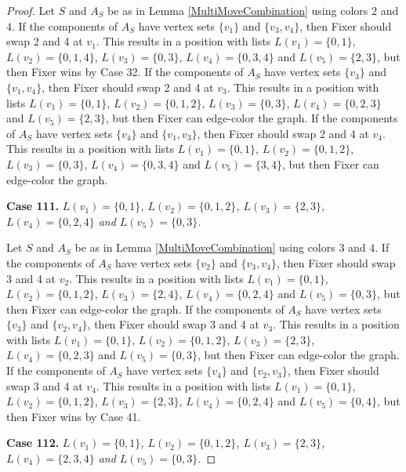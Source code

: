 \documentclass[12pt]{amsart}
\theoremstyle{plain}
\theoremstyle{definition}
\theoremstyle{remark}
\begin{document}
\begin{proof}
Let $S$ and $A_S$ be as in Lemma \ref{MultiMoveCombination} using colors $2$ and $4$. If the components of $A_S$ have vertex sets $\{v_1\}$ and $\{v_3, v_4\}$, then Fixer should swap 2 and 4 at $v_1$. This results in a position with lists $L(v_1) = \{0, 1\}$, $L(v_2) = \{0, 1, 4\}$, $L(v_3) = \{0, 3\}$, $L(v_4) = \{0, 3, 4\}$ and $L(v_5) = \{2, 3\}$, but then Fixer wins by Case 32.
If the components of $A_S$ have vertex sets $\{v_3\}$ and $\{v_1, v_4\}$, then Fixer should swap 2 and 4 at $v_3$. This results in a position with lists $L(v_1) = \{0, 1\}$, $L(v_2) = \{0, 1, 2\}$, $L(v_3) = \{0, 3\}$, $L(v_4) = \{0, 2, 3\}$ and $L(v_5) = \{2, 3\}$, but then Fixer can edge-color the graph.
If the components of $A_S$ have vertex sets $\{v_4\}$ and $\{v_1, v_3\}$, then Fixer should swap 2 and 4 at $v_4$. This results in a position with lists $L(v_1) = \{0, 1\}$, $L(v_2) = \{0, 1, 2\}$, $L(v_3) = \{0, 3\}$, $L(v_4) = \{0, 3, 4\}$ and $L(v_5) = \{3, 4\}$, but then Fixer can edge-color the graph.

\noindent\textbf{Case 111.  }\textit{$L(v_1) = \{0, 1\}$, $L(v_2) = \{0, 1, 2\}$, $L(v_3) = \{2, 3\}$, $L(v_4) = \{0, 2, 4\}$ and $L(v_5) = \{0, 3\}$.}

Let $S$ and $A_S$ be as in Lemma \ref{MultiMoveCombination} using colors $3$ and $4$. If the components of $A_S$ have vertex sets $\{v_2\}$ and $\{v_3, v_4\}$, then Fixer should swap 3 and 4 at $v_2$. This results in a position with lists $L(v_1) = \{0, 1\}$, $L(v_2) = \{0, 1, 2\}$, $L(v_3) = \{2, 4\}$, $L(v_4) = \{0, 2, 4\}$ and $L(v_5) = \{0, 3\}$, but then Fixer can edge-color the graph.
If the components of $A_S$ have vertex sets $\{v_3\}$ and $\{v_2, v_4\}$, then Fixer should swap 3 and 4 at $v_3$. This results in a position with lists $L(v_1) = \{0, 1\}$, $L(v_2) = \{0, 1, 2\}$, $L(v_3) = \{2, 3\}$, $L(v_4) = \{0, 2, 3\}$ and $L(v_5) = \{0, 3\}$, but then Fixer can edge-color the graph.
If the components of $A_S$ have vertex sets $\{v_4\}$ and $\{v_2, v_3\}$, then Fixer should swap 3 and 4 at $v_4$. This results in a position with lists $L(v_1) = \{0, 1\}$, $L(v_2) = \{0, 1, 2\}$, $L(v_3) = \{2, 3\}$, $L(v_4) = \{0, 2, 4\}$ and $L(v_5) = \{0, 4\}$, but then Fixer wins by Case 41.

\noindent\textbf{Case 112.  }\textit{$L(v_1) = \{0, 1\}$, $L(v_2) = \{0, 1, 2\}$, $L(v_3) = \{2, 3\}$, $L(v_4) = \{2, 3, 4\}$ and $L(v_5) = \{0, 3\}$.}


\end{proof}
\end{document}
